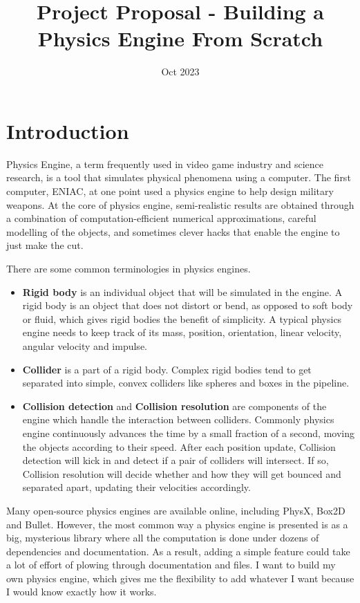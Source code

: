 \documentclass[12pt]{article}
\title{Project Proposal - Building a Physics Engine From Scratch}
\date{Oct 2023}
\begin{document}
\maketitle

\section{Introduction}

Physics Engine, a term frequently used in video game industry and science research, 
is a tool that simulates physical phenomena using a computer.
The first computer, ENIAC, at one point used a physics engine to help design military weapons\cite{rojas2002first}.
At the core of physics engine, semi-realistic results are obtained through a combination of 
computation-efficient numerical approximations, 
careful modelling of the objects, 
and sometimes clever hacks that enable the engine to just make the cut.

There are some common terminologies in physics engines.
\begin{itemize}
\item \textbf{Rigid body} is an individual object that will be simulated in the engine.
A rigid body is an object that does not distort or bend, as opposed to soft body or fluid, 
which gives rigid bodies the benefit of simplicity.
A typical physics engine needs to keep track of its mass, position, orientation, linear velocity, angular velocity and impulse.
\item \textbf{Collider} is a part of a rigid body.
Complex rigid bodies tend to get separated into simple, convex colliders like spheres and boxes in the pipeline.
\item \textbf{Collision detection} and \textbf{Collision resolution} are components of the engine which handle the interaction between colliders.
Commonly physics engine continuously advances the time by a small fraction of a second, moving the objects according to their speed.
After each position update, Collision detection will kick in and detect if a pair of colliders will intersect.
If so, Collision resolution will decide whether and how they will get bounced and separated apart, 
updating their velocities accordingly.
\end{itemize}

Many open-source physics engines are available online, including PhysX\cite{physx}, 
Box2D\cite{box2d} and Bullet\cite{bullet}.
However, the most common way a physics engine is presented is as a big, mysterious library 
where all the computation is done under dozens of dependencies and documentation.
As a result, adding a simple feature could take a lot of effort of plowing through documentation and files.
I want to build my own physics engine, 
which gives me the flexibility to add whatever I want because I would know exactly how it works.
\end{document}
